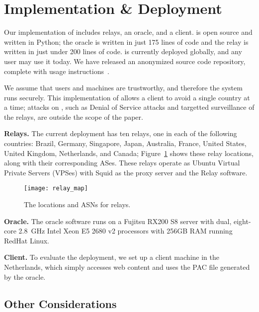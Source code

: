 \section{Implementation \& Deployment}

Our implementation of \system{} includes relays, an oracle, and 
a client. \system{} is open source and written in Python; the oracle is written in just 
175 lines of code and the relay is written in just under 200 lines of code.  \system{} is currently deployed globally, and
any user may use it today.  We have released an anonymized source code repository,
complete with usage instructions~\cite{ran_system}.

We assume that users and machines are trustworthy, and therefore the system runs 
securely.  This implementation of \system{} allows a client to avoid a single country 
at a time; attacks on \system{}, such as Denial of Service attacks and targetted 
surveillance of the relays, are outside the scope of the paper.

{\bf Relays.}  The current deployment has ten relays, one in each
of the following
countries: Brazil,  Germany, Singapore, Japan, Australia, France, United
States, United Kingdom, Netherlands, and Canada; Figure~\ref{fig:relay_locations}
shows these relay locations, along with their corresponding ASes. These relays operate
as Ubuntu Virtual Private Servers (VPSes) with Squid as the proxy
server and the \system{} Relay software.

\begin{figure}[t!]
\centering
\texttt{[image: relay\_map]}
\caption{The locations and ASNs for \system{} relays.}
\label{fig:relay_locations}
\end{figure}

{\bf Oracle.}  The oracle software runs on a Fujitsu RX200 S8 server with dual, 
eight-core 2.8~GHz Intel Xeon E5 2680 v2 processors with 256GB RAM running 
RedHat Linux. 

{\bf Client.} To evaluate the \system{} deployment, we set up a client 
machine in the Netherlands, which simply accesses web content and uses the PAC 
file generated by the oracle. 

\subsection{Other Considerations}


